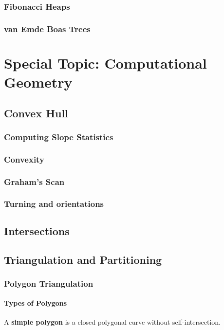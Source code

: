 			\section{Fibonacci Heaps}

			\section{van Emde Boas Trees}

	\part*{Special Topic: Computational Geometry}\label{CG}
		\chapter{Convex Hull}
			\section{Computing Slope Statistics}

			\section{Convexity}

			\section{Graham's Scan}

			\section{Turning and orientations}

		\chapter{Intersections}

		\chapter{Triangulation and Partitioning}
			\section{Polygon Triangulation}
				\subsection{Types of Polygons}
					\begin{definition}
						A \textbf{simple polygon} is a closed polygonal curve without self-intersection.
					\end{definition}

